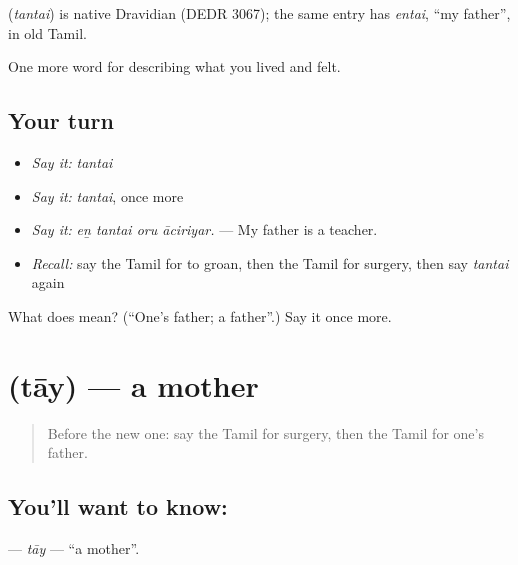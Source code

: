 \begin{cousinweb}
\textbf{} (\emph{tantai}) is native Dravidian (DEDR 3067); the same entry has  \emph{entai}, \textquotedblleft{}my father\textquotedblright{}, in old Tamil.
\end{cousinweb}

\begin{grammarlens}[title={What you've built}]
One more word for describing what you lived and felt.
\end{grammarlens}

\subsection*{Your turn}
\begin{itemize}
\raggedright
  \item \emph{Say it:} \emph{tantai}
  \item \emph{Say it:} \emph{tantai}, once more
  \item \emph{Say it:} \emph{eṉ tantai oru āciriyar.} — My father is a teacher.
  \item \emph{Recall:} say the Tamil for to groan, then the Tamil for surgery, then say \emph{tantai} again
\end{itemize}

\begin{tcolorbox}[breakable,colback=teal!4,colframe=teal!35!black,title={Before you move on}]
What does  mean? (\textquotedblleft{}One’s father; a father\textquotedblright{}.) Say it once more.
\end{tcolorbox}
\section[\texorpdfstring{\ta{தாய்} (tāy)}{தாய் (tāy)}]{ (tāy) — a mother}

\label{lesson:TA-C492-tay}



\begin{quote}
Before the new one: say the Tamil for surgery, then the Tamil for one’s father.
\end{quote}

\subsection*{You'll want to know: }
\textbf{} — \emph{tāy} — \textquotedblleft{}a mother\textquotedblright{}.

